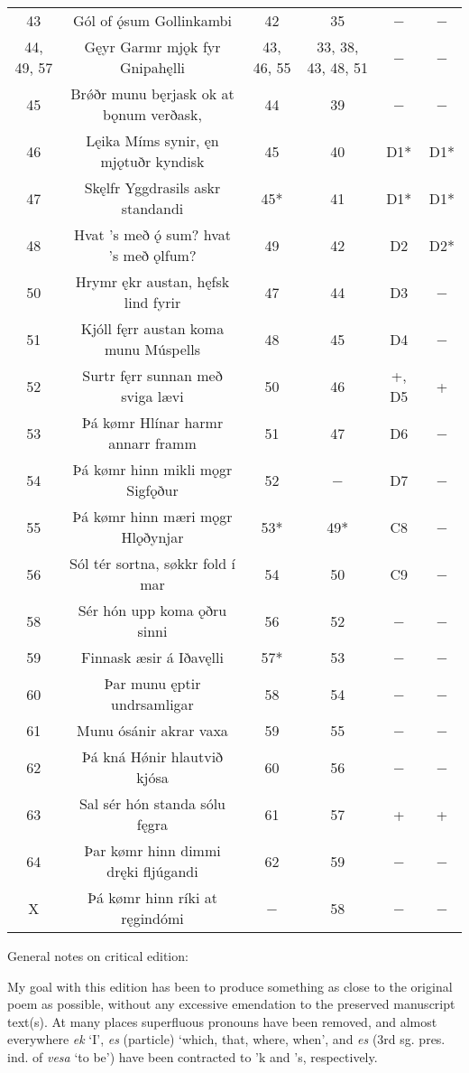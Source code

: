 {\begin{longtable}{|c c c c c c|}
	43 & Gól of ǫ́sum Gollinkambi & 42 & 35 & − & − \\
	44, 49, 57 & Gęyr Garmr mjǫk fyr Gnipahęlli & 43, 46, 55 & 33, 38, 43, 48, 51 & − & − \\
	45 & Brǿðr munu bęrjask ok at bǫnum verðask, & 44 & 39 & − & − \\
	46 & Lęika Míms synir, ęn mjǫtuðr kyndisk & 45 & 40 & D1* & D1* \\
	47 & Skęlfr Yggdrasils askr standandi & 45* & 41 & D1* & D1* \\
	48 & Hvat ’s með ǫ́ sum? hvat ’s með ǫlfum? & 49 & 42 & D2 & D2* \\
	50 & Hrymr ękr austan, hęfsk lind fyrir & 47 & 44 & D3 & − \\
	51 & Kjóll fęrr austan koma munu Múspells & 48 & 45 & D4 & − \\
	52 & Surtr fęrr sunnan með sviga lævi & 50 & 46 & +, D5 & + \\
	53 & Þá kømr Hlínar harmr annarr framm & 51 & 47 & D6 & − \\
	54 & Þá kømr hinn mikli mǫgr Sigfǫður & 52 & − & D7 & − \\
	55 & Þá kømr hinn mæri mǫgr Hlǫðynjar & 53* & 49* & C8 & − \\
	56 & Sól tér sortna, søkkr fold í mar & 54 & 50 & C9 & − \\
	58 & Sér hón upp koma ǫðru sinni & 56 & 52 & − & − \\
	59 & Finnask æsir á Iðavęlli & 57* & 53 & − & − \\
	60 & Þar munu ęptir undrsamligar & 58 & 54 & − & − \\
	61 & Munu ósánir akrar vaxa & 59 & 55 & − & − \\
	62 & Þá kná Hǿnir hlautvið kjósa & 60 & 56 & − & − \\
	63 & Sal sér hón standa sólu fęgra & 61 & 57 & + & + \\
	64 & Þar kømr hinn dimmi dręki fljúgandi & 62 & 59 & − & − \\
	X & Þá kømr hinn ríki at ręgindómi & − & 58 & − & − \\ [1ex]
	\hline
\end{longtable}



General notes on critical edition: %

My goal with this edition has been to produce something as close to the original poem as possible, without any excessive emendation to the preserved manuscript text(s). At many places superfluous pronouns have been removed, and almost everywhere \emph{ek} ‘I’, \emph{es} (particle) ‘which, that, where, when’, and \emph{es} (3rd sg. pres. ind. of \emph{vesa} ‘to be’) have been contracted to ’k and ’s, respectively.}




